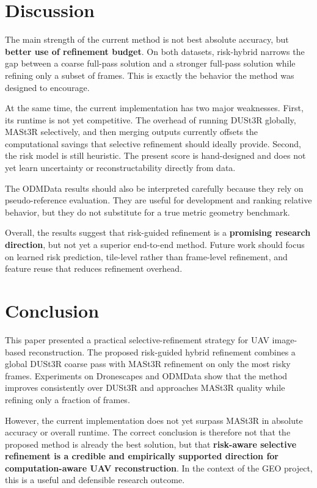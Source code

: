 \documentclass[preprint,12pt]{elsarticle}
\begin{document}
\section{Discussion}

The main strength of the current method is not best absolute accuracy, but \textbf{better use of refinement budget}. On both datasets, risk-hybrid narrows the gap between a coarse full-pass solution and a stronger full-pass solution while refining only a subset of frames. This is exactly the behavior the method was designed to encourage.

At the same time, the current implementation has two major weaknesses. First, its runtime is not yet competitive. The overhead of running DUSt3R globally, MASt3R selectively, and then merging outputs currently offsets the computational savings that selective refinement should ideally provide. Second, the risk model is still heuristic. The present score is hand-designed and does not yet learn uncertainty or reconstructability directly from data.

The ODMData results should also be interpreted carefully because they rely on pseudo-reference evaluation. They are useful for development and ranking relative behavior, but they do not substitute for a true metric geometry benchmark.

Overall, the results suggest that risk-guided refinement is a \textbf{promising research direction}, but not yet a superior end-to-end method. Future work should focus on learned risk prediction, tile-level rather than frame-level refinement, and feature reuse that reduces refinement overhead.

\section{Conclusion}

This paper presented a practical selective-refinement strategy for UAV image-based reconstruction. The proposed risk-guided hybrid refinement combines a global DUSt3R coarse pass with MASt3R refinement on only the most risky frames. Experiments on Dronescapes and ODMData show that the method improves consistently over DUSt3R and approaches MASt3R quality while refining only a fraction of frames.

However, the current implementation does not yet surpass MASt3R in absolute accuracy or overall runtime. The correct conclusion is therefore not that the proposed method is already the best solution, but that \textbf{risk-aware selective refinement is a credible and empirically supported direction for computation-aware UAV reconstruction}. In the context of the GEO project, this is a useful and defensible research outcome.
\end{document}
